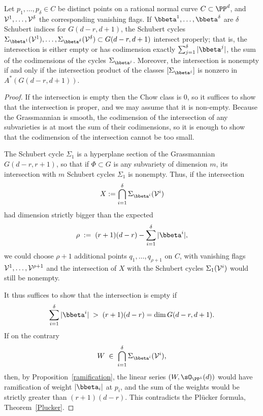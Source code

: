 \begin{theorem}\label{osculating intersection}
Let $p_1,\dots,p_\delta \in C$ be distinct points on a rational normal curve $C \subset \PP^d$, and ${\cal V}^1, \dots, {\cal V}^\delta$ the corresponding vanishing flags. If ${\bbeta}^1, \dots, {\bbeta}^\delta$ are $\delta$ Schubert indices for $G(d-r, d+1)$, the Schubert cycles $\Sigma_{{\bbeta}^1}({\cal V}^1), \dots, \Sigma_{{\bbeta}^\delta}({\cal V}^\delta) \subset G(d-r, d+1)$ intersect properly; that is, the intersection is either empty or has codimension exactly $\sum_{j =1}^{\delta}|\bbeta^{j}|$,
the sum of the codimensions of the cycles $\Sigma_{{\bbeta}^j}$. Moreover, the intersection is nonempty if and only if
 the intersection product of the classes $[\Sigma_{{\bbeta}^j}]$ is nonzero in $A^*(G(d-r, d+1))$.
\end{theorem}


\begin{proof} 
If the intersection is empty then the Chow class is 0, so it suffices to show that the intersection is proper,
and we may assume that it is non-empty. Because the Grassmannian is smooth, the codimension of the intersection of any subvarieties
 is at most the sum of their codimensions, so it is enough to show that the codimension of the
 intersection cannot be too small.

The Schubert cycle $\Sigma_1$ is a hyperplane section of the Grassmannian $G(d-r, r+1)$, so that if $\Phi \subset G$ is any subvariety of dimension $m$, its intersection with $m$ Schubert cycles $\Sigma_1$ is nonempty. Thus, if the intersection
$$
X := \bigcap_{i=1}^\delta \Sigma_{{\bbeta}^i}({\cal V}^i)
$$
had dimension strictly bigger than the expected
$$
\rho \; := \; (r+1)(d-r) - \sum_{i=1}^\delta |{\bbeta}^i|,
$$
we could choose $\rho + 1$ additional points $q_1,\dots,q_{\rho + 1}$ on $C$, with vanishing flags ${\cal V}^1, \dots, {\cal V}^{\rho + 1}$ and the intersection of $X$ with the Schubert cycles $\Sigma_1({\cal V}^i)$ would still be nonempty.

It thus suffices to show that the intersection is empty if
$$
\sum_{i=1}^\delta |{\bbeta}^i| \; > \; (r+1)(d-r) = \dim G(d-r, d+1).
$$
If on the contrary 
$$
W \; \in \; \bigcap_{i=1}^\delta \Sigma_{{\bbeta}^i}({\cal V}^i),
$$
then, by Proposition~\ref{ramification}, the linear series $(W, \sO_{\PP^{1}}(d))$  would have
ramification of weight $|{\bbeta_i}|$ at $p_i$, and the sum of the weights would be strictly greater than $(r+1)(d-r)$. 
This contradicts the Pl\"ucker formula, Theorem~\ref{Plucker}.
\end{proof}

